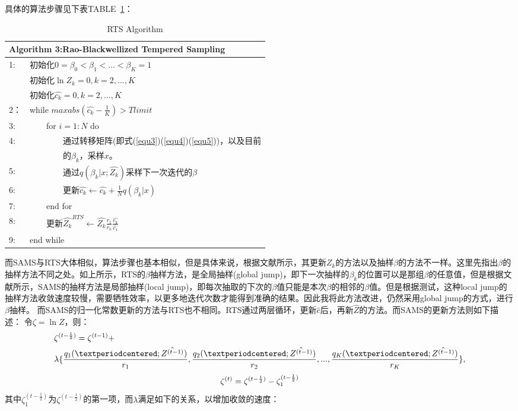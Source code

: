 \documentclass[journal,a4paper]{IEEEtran}
\begin{document}
	具体的算法步骤见下表TABLE~\ref{tab3}：
	\begin{table}[h]
		\begin{tabular}{ll}
			\hline
			\multicolumn{2}{l}{\textbf{Algorithm 3:}Rao-Blackwellized Tempered Sampling} \\
			\hline
			1: & 初始化$ 0=\beta_0<\beta_1<...<\beta_K=1$\\
			   & 初始化$\ln Z_k=0,k=2,...,K$ \\
			   & 初始化$\hat{c_k}=0,k=2,...,K$ \\
			2：& while $max{abs(\hat{c_k}-\frac{1}{K})}>Tlimit$\\
			3: & ~~~~for $i = 1 : N$ do \\
			4: & ~~~~~~~~通过转移矩阵(即式(\ref{equ3})(\ref{equ4})(\ref{equ5}))，以及目前 \\
			   & ~~~~~~~~的$\beta_k$，采样$x$。\\
			5: & ~~~~~~~~通过$q(\beta_k|x;\hat{Z_k})$采样下一次迭代的$\beta$ \\
			6: & ~~~~~~~~更新$\hat{c_k} \leftarrow \hat{c_k} + \frac{1}{N} q(\beta_k|x)$ \\
			7: & ~~~~end for\\
			8: & ~~~~更新$\hat{Z_k}^{RTS} \leftarrow \hat{Z_k}\frac{r_1}{r_k} \frac{\hat{c_k}}{\hat{c_1}}$ \\
			9: & end while\\

			\hline
		\end{tabular}
		\caption{RTS Algorithm}
		\label{tab3}
	\end{table}

	而SAMS与RTS大体相似，算法步骤也基本相似，但是具体来说，根据文献\cite{tan2015optimally}所示，其更新$Z_k$的方法以及抽样$\beta$的方法不一样。这里先指出$\beta$的抽样方法不同之处。如上所示，RTS的$\beta$抽样方法，是全局抽样(global jump)，即下一次抽样的$\beta_k$的位置可以是那组$\beta$的任意值，但是根据文献\cite{salakhutdinov2009learning}所示，SAMS的抽样方法是局部抽样(local jump)，即每次抽取的下次的$\beta$值只能是本次$\beta$的相邻的$\beta$值。但是根据测试，这种local jump的抽样方法收敛速度较慢，需要牺牲效率，以更多地迭代次数才能得到准确的结果。因此我将此方法改进，仍然采用global jump的方式，进行$\beta$抽样。
	而SAMS的归一化常数更新的方法与RTS也不相同。RTS通过两层循环，更新$\hat{c}$后，再新$\hat{Z}$的方法。而SAMS的更新方法则如下描述：
	令$\zeta = \ln Z$，则：
	\begin{align}
		& \zeta^{(t-\frac{1}{2})} = \zeta^{(t-1)} + \notag \\ 
		& \lambda\{\frac{q_1(·;\hat{Z^{(t-1)}})}{r_1},\frac{q_2(·;\hat{Z^{(t-1)}})}{r_2},...,\frac{q_K(·;\hat{Z^{(t-1)}})}{r_K}\},
	\end{align}
	\begin{equation}
		\zeta^{(t)} = \zeta^{(t-\frac{1}{2})} - \zeta_1^{(t-\frac{1}{2})} \notag
	\end{equation}
	其中$\zeta_1^{(t-\frac{1}{2})}$为$\zeta^{(t-\frac{1}{2})}$的第一项，而$\lambda$满足如下的关系，以增加收敛的速度：
	
\end{document}

